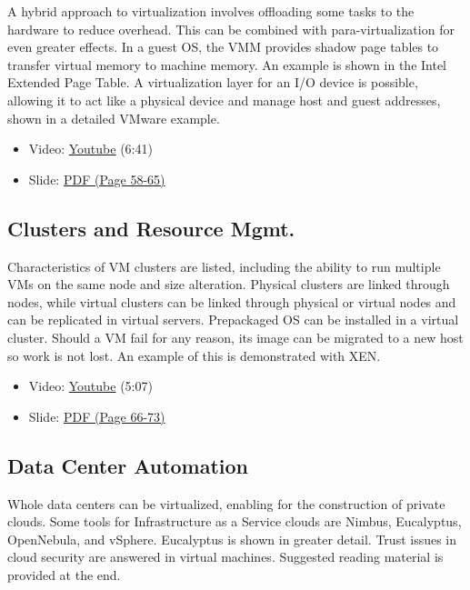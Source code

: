 A hybrid approach to virtualization involves offloading some tasks to
the hardware to reduce overhead. This can be combined with
para-virtualization for even greater effects. In a guest OS, the VMM
provides shadow page tables to transfer virtual memory to machine
memory. An example is shown in the Intel Extended Page Table. A
virtualization layer for an I/O device is possible, allowing it to act
like a physical device and manage host and guest addresses, shown in a
detailed VMware example.

\begin{itemize}
\tightlist
\item
  Video: \href{https://www.youtube.com/watch?v=I_J4eUUavSY}{Youtube}
  (6:41)
\item
  Slide:
  \href{https://drive.google.com/open?id=0B88HKpainTSfQU1uQmxZWHdWQ1k}{PDF
  (Page 58-65)}
\end{itemize}

\subsection{Clusters and Resource
Mgmt.}\label{clusters-and-resource-mgmt.}

Characteristics of VM clusters are listed, including the ability to run
multiple VMs on the same node and size alteration. Physical clusters are
linked through nodes, while virtual clusters can be linked through
physical or virtual nodes and can be replicated in virtual servers.
Prepackaged OS can be installed in a virtual cluster. Should a VM fail
for any reason, its image can be migrated to a new host so work is not
lost. An example of this is demonstrated with XEN.

\begin{itemize}
\tightlist
\item
  Video: \href{https://www.youtube.com/watch?v=Mn9pgGtFy4g}{Youtube}
  (5:07)
\item
  Slide:
  \href{https://drive.google.com/open?id=0B88HKpainTSfQU1uQmxZWHdWQ1k}{PDF
  (Page 66-73)}
\end{itemize}

\subsection{Data Center Automation}\label{data-center-automation}

Whole data centers can be virtualized, enabling for the construction of
private clouds. Some tools for Infrastructure as a Service clouds are
Nimbus, Eucalyptus, OpenNebula, and vSphere. Eucalyptus is shown in
greater detail. Trust issues in cloud security are answered in virtual
machines. Suggested reading material is provided at the end.

